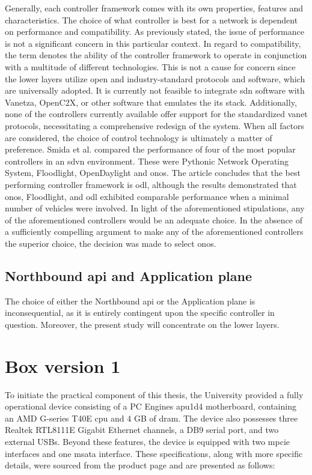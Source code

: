 Generally, each controller framework comes with its own properties, features and characteristics. The choice of what controller is best for a network is dependent on performance and compatibility.  As previously stated, the issue of performance is not a significant concern in this particular context. In regard to compatibility, the term denotes the ability of the controller framework to operate in conjunction with a multitude of different technologies. This is not a cause for concern since the lower layers utilize open and industry-standard protocols and software, which are universally adopted.
It is currently not feasible to integrate \gls{sdn} software with Vanetza, OpenC2X, or other software that emulates the \gls{its} stack. Additionally, none of the controllers currently available offer support for the standardized \gls{vanet} protocols, necessitating a comprehensive redesign of the system.
When all factors are considered, the choice of control technology is ultimately a matter of preference. Smida et al.\cite{smida_efficient_2020} compared the performance of four of the most popular controllers in an \gls{sdvn} environment. These were Pythonic Network Operating System, Floodlight, OpenDaylight and \gls{onos}. The article concludes that the best performing controller framework is \gls{odl}, although the results demonstrated that \gls{onos}, Floodlight, and \gls{odl} exhibited comparable performance when a minimal number of vehicles were involved. In light of the aforementioned stipulations, any of the aforementioned controllers would be an adequate choice. In the absence of a sufficiently compelling argument to make any of the aforementioned controllers the superior choice, the decision was made to select \gls{onos}\cite{noauthor_opennetworkinglabonos_nodate}.


\subsection[Northbound API and Application plane]{Northbound \gls{api} and Application plane}

The choice of either the Northbound \gls{api} or the Application plane is inconsequential, as it is entirely contingent upon the specific controller in question. Moreover, the present study will concentrate on the lower layers.

\section{Box version 1}
To initiate the practical component of this thesis, the University provided a fully operational device consisting of a PC Engines apu1d4 motherboard, containing an AMD G-series T40E \gls{cpu} and 4 GB of \gls{dram}. The device also possesses three Realtek RTL8111E Gigabit Ethernet channels, a DB9 serial port, and two external USBs. Beyond these features, the device is equipped with two \gls{mpcie} interfaces and one \gls{msata} interface. 
These specifications, along with more specific details, were sourced from the product page and are presented as follows:

